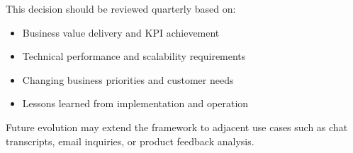 \documentclass[11pt]{article}
\begin{document}
This decision should be reviewed quarterly based on:
\begin{itemize}
\item Business value delivery and KPI achievement
\item Technical performance and scalability requirements
\item Changing business priorities and customer needs
\item Lessons learned from implementation and operation
\end{itemize}

Future evolution may extend the framework to adjacent use cases such as chat transcripts, email inquiries, or product feedback analysis.
\end{document}
